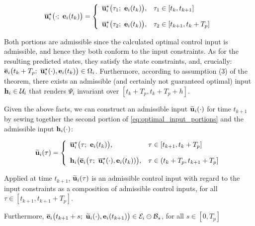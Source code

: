 \begin{equation}
  \overline{\vect{u}}_i^{\star}\big(\cdot;\ \vect{e}_i(t_k)\big) = \left\{
      \begin{array}{ll}
        \overline{\vect{u}}_i^{\star}\big(\tau_1;\ \vect{e}_i(t_k)\big), & \tau_1 \in [t_k, t_{k+1}] \\[2.5ex]
        \overline{\vect{u}}_i^{\star}\big(\tau_2;\ \vect{e}_i(t_k)\big), & \tau_2 \in [t_{k+1}, t_k + T_p]
      \end{array}
      \right.
  \label{eq:optimal_input_portions}
\end{equation}

Both portions are admissible since the calculated optimal control input is
admissible, and hence they both conform to the input constraints.
As for the resulting predicted states, they satisfy the state constraints, and,
crucially: $\overline{\vect{e}}_i\big(t_k + T_p;\ \overline{\vect{u}}_i^{\star}(\cdot), \vect{e}_i(t_k)\big) \in \Omega_i$.
Furthermore, according to assumption (3) of the theorem, there exists an
admissible (and certainly not guaranteed optimal) input
$\bm{\mathbf{h}}_i \in \mathcal{U}_i$ that renders $\Psi_i$ invariant
over $[t_k + T_p, t_k + T_p + h]$.

Given the above facts, we can construct an admissible input
$\widetilde{\bm{\mathbf{u}}}_i(\cdot)$  for time $t_{k+1}$ by sewing together the second
portion of \eqref{eq:optimal_input_portions} and the admissible input
$\bm{\mathbf{h}}_i(\cdot)$:

\begin{equation}
  \widetilde{\vect{u}}_i(\tau) = \left\{
      \begin{array}{ll}
        \overline{\vect{u}}_i^{\star}\big(\tau;\ \vect{e}_i(t_k)\big), & \tau \in [t_{k+1}, t_k + T_p] \\[2.5ex]
        \vect{h}_i\big(\overline{\vect{e}}_i\big(\tau;\ \overline{\vect{u}}_i^{\star}(\cdot), \vect{e}_i(t_k))\big), & \tau \in (t_k + T_p, t_{k+1} + T_p]
      \end{array}
      \right.
\label{eq:optimal_input_t_plus_one}
\end{equation}

Applied at time $t_{k+1}$, $\widetilde{\bm{\mathbf{u}}}_i(\tau)$
is an admissible control input with regard to the input constraints as
a composition of admissible control inputs, for
all $\tau \in [t_{k+1}, t_{k+1} + T_p]$.


Furthermore, $\overline{\vect{e}}_i\big(t_{k+1} + s;\ \widetilde{\vect{u}}_i(\cdot), \vect{e}_i(t_{k+1})\big) \in \mathcal{E}_i \ominus \mathcal{B}_{s}$,
for all $s \in [0,  T_p]$


